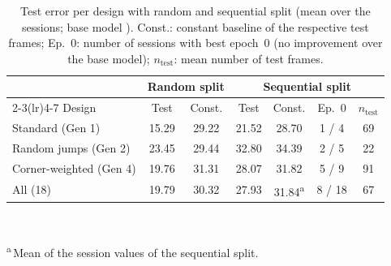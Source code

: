 \begin{table}[htbp]
  \centering
  \caption[Test error per design with random and sequential split]{Test error per design with random and sequential split (mean over
           the sessions; base model ). Const.: constant
           baseline of the respective test frames; Ep.~0: number of sessions
           with best epoch~0 (no improvement over the base model);
           $n_{\text{test}}$: mean number of test frames.}
  \label{tab:design_perf}
  \footnotesize
  \setlength{\tabcolsep}{4pt}
  \begin{tabular}{l cc cccc}
    \toprule
    & \multicolumn{2}{c}{Random split} & \multicolumn{4}{c}{Sequential split} \\
    \cmidrule(lr){2-3}\cmidrule(lr){4-7}
    Design & Test & Const. & Test & Const. & Ep.~0 & $n_{\text{test}}$ \\
    \midrule
    Standard (Gen 1)          & 15.29 & 29.22 & 21.52 & 28.70 & 1 / 4 & 69 \\
    Random jumps (Gen 2)      & 23.45 & 29.44 & 32.80 & 34.39 & 2 / 5 & 22 \\
    Corner-weighted (Gen 4)   & 19.76 & 31.31 & 28.07 & 31.82 & 5 / 9 & 91 \\
    \midrule
    All (18)                  & 19.79 & 30.32 & 27.93 & 31.84\textsuperscript{a} & 8 / 18 & 67 \\
    \bottomrule
  \end{tabular}\\[1mm]
  \parbox{0.9\linewidth}{\footnotesize \textsuperscript{a}\,Mean of the session
  values of the sequential split.}
\end{table}

